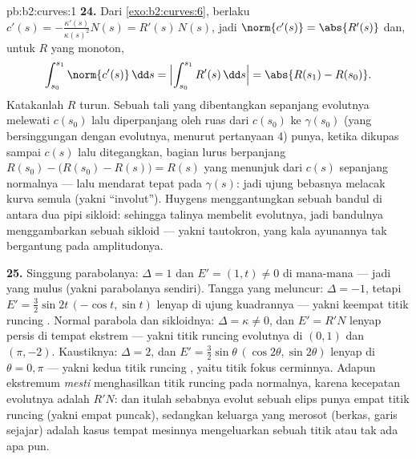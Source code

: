 \begin{solution}{pb:b2:curves:1}
\textbf{24.} Dari \cref{exo:b2:curves:6}, berlaku $c'(s) =
-\frac{\kappa'(s)}{\kappa(s)^2}N(s) = R'(s)\,N(s)$, jadi
$\norm{c'(s)} = \abs{R'(s)}$ dan, untuk $R$ yang monoton,
\[
\int_{s_0}^{s_1}\norm{c'(s)}\,\dd s =
\Bigl|\int_{s_0}^{s_1}R'(s)\,\dd s\Bigr| = \abs{R(s_1) -
R(s_0)} .
\]
Katakanlah $R$ turun. Sebuah tali yang dibentangkan sepanjang evolutnya melewati
$c(s_0)$ lalu diperpanjang oleh ruas dari $c(s_0)$ ke
$\gamma(s_0)$ (yang bersinggungan dengan evolutnya, menurut pertanyaan 4)
punya, ketika dikupas sampai $c(s)$ lalu ditegangkan, bagian
lurus berpanjang $R(s_0) - \bigl(R(s_0) - R(s)\bigr) = R(s)$
yang menunjuk dari $c(s)$ sepanjang normalnya --- lalu mendarat tepat pada
$\gamma(s)$: jadi ujung bebasnya melacak kurva semula
(yakni ``involut''). Huygens menggantungkan sebuah bandul di antara dua pipi
sikloid: sehingga talinya membelit evolutnya, jadi bandulnya menggambarkan sebuah
sikloid --- yakni tautokron, yang kala ayunannya tak
bergantung pada amplitudonya.

\textbf{25.} Singgung parabolanya: $\Delta = 1$ dan $E' =
(1, t) \neq 0$ di mana-mana --- jadi  yang mulus (yakni parabolanya
sendiri). Tangga yang meluncur: $\Delta = -1$, tetapi $E' =
\tfrac32\sin 2t\,(-\cos t, \sin t)$ lenyap di ujung
kuadrannya --- yakni keempat titik runcing . Normal
parabola dan sikloidnya: $\Delta = \kappa \neq 0$, dan
$E' = R'N$ lenyap persis di tempat  ekstrem
--- yakni titik runcing evolutnya di $(0,1)$ dan $(\pi, -2)$. Kaustiknya:
$\Delta = 2$, dan $E' = \tfrac32\sin\theta\,(\cos2\theta,
\sin2\theta)$ lenyap di $\theta = 0, \pi$ --- yakni kedua titik runcing
, yaitu titik fokus cerminnya. Adapun ekstremum
 \emph{mesti} menghasilkan titik runcing pada 
normalnya, karena kecepatan evolutnya adalah $R'N$: dan itulah sebabnya
evolut sebuah elips punya empat titik runcing (yakni empat puncak),
sedangkan keluarga yang merosot (berkas, garis sejajar) adalah kasus
tempat mesinnya mengeluarkan sebuah titik atau tak ada apa pun.

\end{solution}
